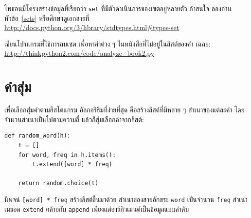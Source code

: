 \begin{exercise}


ไพธอนมีโครงสร้างข้อมูลที่เรียกว่า \texttt{set} ที่มีตัวดำเนินการของเซตอยู่หลายตัว
ถ้าสนใจ ลองอ่านหัวข้อ~\ref{sets} หรือศึกษาดูเอกสารที่
\url{http://docs.python.org/3/library/stdtypes.html#types-set}


เขียนโปรแกรมที่ใช้การลบเซต เพื่อหาคำต่าง ๆ ในหนังสือที่ไม่อยู่ในลิสต์ของคำ
เฉลย: \url{http://thinkpython2.com/code/analyze_book2.py}

\end{exercise}


\section{คำสุ่ม}
\label{randomwords}


เพื่อเลือกสุ่มคำตามฮิสโตแกรม
อัลกอริธึมที่ง่ายที่สุด คือสร้างลิสต์ที่มีหลาย ๆ สำเนาของแต่ละคำ 
โดยจำนวนสำเนาเป็นไปตามความถี่ แล้วก็สุ่มเลือกคำจากลิสต์:

\begin{verbatim}
def random_word(h):
    t = []
    for word, freq in h.items():
        t.extend([word] * freq)

    return random.choice(t)
\end{verbatim}
%
%
นิพจน์ \texttt{[word] * freq} สร้างลิสต์ขึ้นมาด้วย
สำเนาของสายอักขระ \texttt{word} 
เป็นจำนวน \texttt{freq} สำเนา
เมธอด \texttt{extend} คล้ายกับ \texttt{append} 
เพียงแต่อาร์กิวเมนต์เป็นข้อมูลแบบลำดับ

